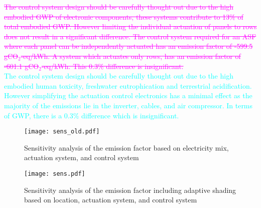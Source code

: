 \textcolor{magenta}{\sout{The control system design should be carefully thought out due to the high embodied GWP of electronic components, these systems contribute to 13\% of total embodied GWP. However limiting the individual actuation of panels to rows does not result in a significant difference. The control system required for an ASF where each panel can be independently actuated has an emission factor of -599.5 gCO$_{2}$-eq/kWh. A system which actuates only rows, has an emission factor of -601.1 gCO$_{2}$-eq/kWh. This 0.3\% difference is insignificant.\\}}
\textcolor{cyan}{The control system design should be carefully thought out due to the high embodied human toxicity, freshwater eutrophication and terrestrial acidification. However simplifying the actuation control electronics has a minimal effect as the majority of the emissions lie in the inverter, cables, and air compressor. In terms of GWP, there is a 0.3\% difference which is insignificant.}



\begin{figure}[H]
\begin{center}
\begin{mdframed}[linecolor=magenta, linewidth=2pt]
\texttt{[image: sens\_old.pdf]}
\caption{Sensitivity analysis of the emission factor based on electricity mix, actuation system, and control system}
\label{fig:sensold}
\end{mdframed}
\end{center}
\end{figure}

\begin{figure}[H]
\begin{center}
\begin{mdframed}[linecolor=cyan, linewidth=2pt]
\texttt{[image: sens.pdf]}
\caption{Sensitivity analysis of the emission factor including adaptive shading based on location, actuation system, and control system}
\label{fig:sens}
\end{mdframed}
\end{center}
\end{figure}

